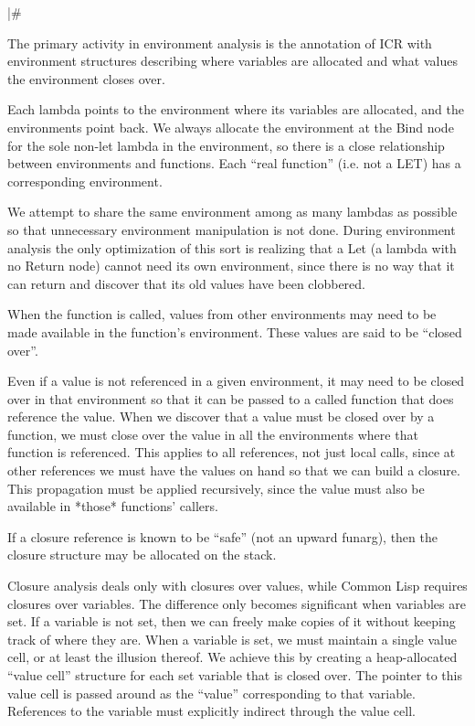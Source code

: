 |\#

The primary activity in environment analysis is the annotation of ICR with
environment structures describing where variables are allocated and what values
the environment closes over.

Each lambda points to the environment where its variables are allocated, and
the environments point back.  We always allocate the environment at the Bind
node for the sole non-let lambda in the environment, so there is a close
relationship between environments and functions.  Each ``real function'' (i.e.
not a LET) has a corresponding environment.

We attempt to share the same environment among as many lambdas as possible so
that unnecessary environment manipulation is not done.  During environment
analysis the only optimization of this sort is realizing that a Let (a lambda
with no Return node) cannot need its own environment, since there is no way
that it can return and discover that its old values have been clobbered.

When the function is called, values from other environments may need to be made
available in the function's environment.  These values are said to be ``closed
over''.

Even if a value is not referenced in a given environment, it may need to be
closed over in that environment so that it can be passed to a called function
that does reference the value.  When we discover that a value must be closed
over by a function, we must close over the value in all the environments where
that function is referenced.  This applies to all references, not just local
calls, since at other references we must have the values on hand so that we can
build a closure.  This propagation must be applied recursively, since the value
must also be available in *those* functions' callers.

If a closure reference is known to be ``safe'' (not an upward funarg), then the
closure structure may be allocated on the stack.

Closure analysis deals only with closures over values, while Common Lisp
requires closures over variables.  The difference only becomes significant when
variables are set.  If a variable is not set, then we can freely make copies of
it without keeping track of where they are.  When a variable is set, we must
maintain a single value cell, or at least the illusion thereof.  We achieve
this by creating a heap-allocated ``value cell'' structure for each set variable
that is closed over.  The pointer to this value cell is passed around as the
``value'' corresponding to that variable.  References to the variable must
explicitly indirect through the value cell.

